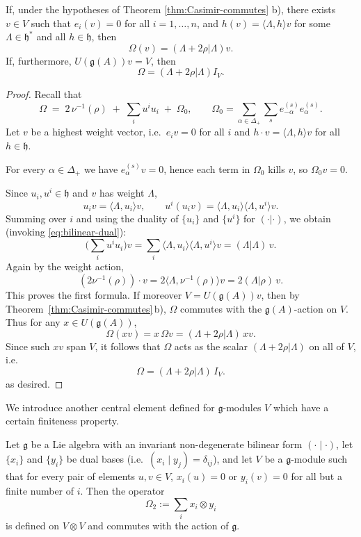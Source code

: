 \documentclass[12pt]{article}
\begin{document}
\begin{corollary}\label{cor:Casimir-eigenvalue}
    If, under the hypotheses of Theorem \ref{thm:Casimir-commutes} b), there exists $v \in V$ such that
    $e_i(v)=0$ for all $i=1,\dots,n$, and $h(v)=\langle \Lambda,h\rangle v$ for some $\Lambda \in \mathfrak{h}^*$ and all $h \in \mathfrak{h}$, then
    \[
        \Omega(v) = (\Lambda+2\rho|\Lambda)v.
    \]
    If, furthermore, $U(\mathfrak{g}(A))v=V$, then
    \[
        \Omega = (\Lambda+2\rho|\Lambda)I_V.
    \]
\end{corollary}
\begin{proof}
    Recall that
    \[
        \Omega \;=\; 2\,\nu^{-1}(\rho)\;+\;\sum_i u^i u_i\;+\;\Omega_0,
        \qquad
        \Omega_0=\sum_{\alpha\in\Delta_+}\sum_s e_{-\alpha}^{(s)}e_{\alpha}^{(s)}.
    \]
    Let $v$ be a highest weight vector, i.e.\ $e_i v=0$ for all $i$ and
    $h\cdot v=\langle\Lambda,h\rangle v$ for all $h\in\mathfrak h$.

    For every $\alpha\in\Delta_+$ we have $e_\alpha^{(s)}v=0$, hence each term in $\Omega_0$ kills $v$, so $\Omega_0 v=0$.

    Since $u_i,u^i\in\mathfrak h$ and $v$ has weight $\Lambda$,
    \[
        u_i v=\langle\Lambda,u_i\rangle v,\qquad
        u^i(u_i v)=\langle\Lambda,u_i\rangle \langle\Lambda,u^i\rangle v.
    \]
    Summing over $i$ and using the duality of $\{u_i\}$ and $\{u^i\}$ for $(\cdot|\cdot)$, we obtain (invoking \ref{eq:bilinear-dual}):
    \[
        \Big(\sum_i u^i u_i\Big)v
        =\sum_i \langle\Lambda,u_i\rangle \langle\Lambda,u^i\rangle v
        =(\Lambda|\Lambda)\,v.
    \]
    Again by the weight action,
    \[
        (2\nu^{-1}(\rho))\cdot v
        =2\langle\Lambda,\nu^{-1}(\rho)\rangle v
        =2(\Lambda|\rho)\,v.
    \]
    This proves the first formula. If moreover $V=U(\mathfrak g(A))v$, then by Theorem~\ref{thm:Casimir-commutes}\,b),
    $\Omega$ commutes with the $\mathfrak g(A)$-action on $V$. Thus for any $x\in U(\mathfrak g(A))$,
    \[
        \Omega(xv)=x\,\Omega v
        =(\Lambda+2\rho|\Lambda)\,xv.
    \]
    Since such $xv$ span $V$, it follows that $\Omega$ acts as the scalar $(\Lambda+2\rho|\Lambda)$ on all of $V$, i.e.
    \[
        \Omega=(\Lambda+2\rho|\Lambda)\,I_V.
    \]
    as desired.
\end{proof}
We introduce another central element defined for $\mathfrak g$-modules $V$ which have a certain finiteness property. 
\begin{proposition}
    Let $\mathfrak g$ be a Lie algebra with an invariant non-degenerate bilinear form $(\cdot \mid \cdot)$, let $\{x_i\}$ and $\{y_i\}$ be dual bases (i.e.\ $(x_i \mid y_j) = \delta_{ij}$), and let $V$ be a $\mathfrak g$-module such that for every pair of elements $u,v \in V$, $x_i(u)=0$ or $y_i(v)=0$ for all but a finite number of $i$. Then the operator
    \[
        \Omega_2 := \sum_i x_i \otimes y_i
    \]
    is defined on $V \otimes V$ and commutes with the action of $\mathfrak g$.
\end{proposition}
\end{document}
